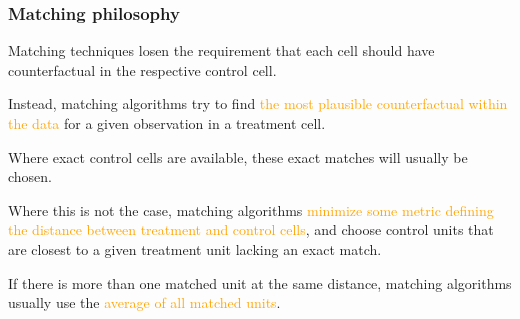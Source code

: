 \documentclass[12pt,english,dvipsnames,aspectratio=169,handout]{beamer}\usepackage[]{graphicx}\usepackage[]{xcolor}
\begin{document}
\begin{frame}
  \frametitle{Matching philosophy}
\footnotesize

Matching techniques losen the requirement that each cell should have counterfactual in the respective control cell.

Instead, matching algorithms try to find \textcolor{orange}{the most plausible counterfactual within the data} for a given observation in a treatment cell.

Where exact control cells are available, these exact matches will usually be chosen. 

Where this is not the case, matching algorithms \textcolor{orange}{minimize some metric defining the distance between treatment and control cells}, and choose control units that are closest to a given treatment unit lacking an exact match.

If there is more than one matched unit at the same distance, matching algorithms usually use the \textcolor{orange}{average of all matched units}.


\end{frame}
\end{document}
